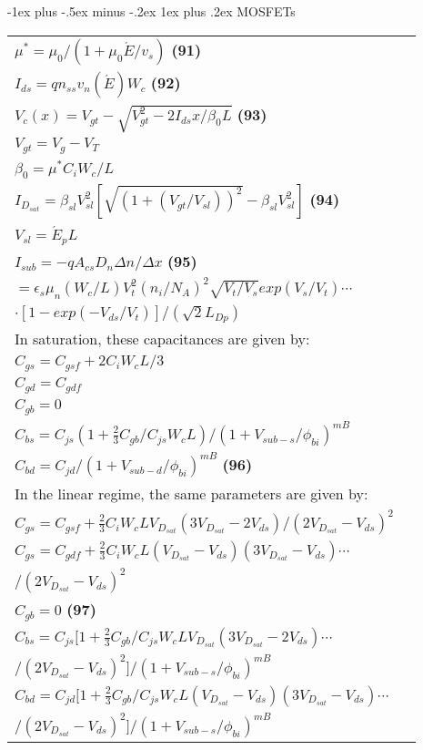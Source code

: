 \documentclass[10pt,landscape]{article}
\makeatletter
\renewcommand{\subsubsection}{\@startsection{subsubsection}{3}{0mm}%
                                {-1ex plus -.5ex minus -.2ex}%
                                {1ex plus .2ex}%
                                {\normalfont\small\bfseries}}
\makeatother
\begin{document}
\begin{multicols}{3}
\subsubsection{MOSFETs}
\begin{tabular}{@{}ll@{}}
$ \mu^*=\mu_0/(1+\mu_0 \acute{E}/v_s)$ \textbf{(91)} \\
$ I_{ds}=qn_{ss}v_n(\acute{E})W_c$ \textbf{(92)} \\
$ V_c(x)=V_{gt}-\sqrt{V^2_{gt}-2I_{ds}x/\beta_0L}$ \textbf{(93)} \\
$ V_{gt}=V_g-V_T$ \\
$ \beta_0=\mu^*C_iW_c/L$ \\
$ I_{D_{sat}}=\beta_{sl}V^2_{sl}[\sqrt{(1+(V_{gt}/V_{sl}))^2}-\beta_{sl}V^2_{sl}]$ \textbf{(94)} \\
$ V_{sl}=\acute{E}_pL$ \\
$ I_{sub}=-qA_{cs}D_n\Delta n/\Delta x$ \textbf{(95)} \\
$ =\epsilon_s\mu_n(W_c/L)V^2_t(n_i/N_A)^2\sqrt{V_t/V_s}exp(V_s/V_t)\cdots$ \\
$\cdot[1-exp(-V_{ds}/V_t)]/(\sqrt{2}L_{Dp})$ \\
In saturation, these capacitances are given by:\\
$ C_{gs}=C_{gsf}+2C_iW_cL/3$ \\
$ C_{gd}=C_{gdf}$ \\
$ C_{gb}=0$ \\
$ C_{bs}=C_{js}(1+\frac{2}{3}C_{gb}/C_{js}W_cL)/(1+V_{sub-s}/\phi_{bi})^{mB}$ \\
$ C_{bd}=C_{jd}/(1+V_{sub-d}/\phi_{bi})^{mB}$ \textbf{(96)} \\
In the linear regime, the same parameters are given by:\\
$ C_{gs}=C_{gsf}+\frac{2}{3}C_iW_cLV_{D_{sat}}(3V_{D_{sat}}-2V_{ds})/(2V_{D_{sat}}-V_{ds})^2$ \\
$ C_{gs}=C_{gdf}+\frac{2}{3}C_iW_cL(V_{D_{sat}}-V_{ds})(3V_{D_{sat}}-V_{ds})\cdots$ \\
$/(2V_{D_{sat}}-V_{ds})^2$ \\
$ C_{gb}=0$ \textbf{(97)} \\
$ C_{bs}=C_{js}[1+\frac{2}{3}C_{gb}/C_{js}W_cLV_{D_{sat}}(3V_{D_{sat}}-2V_{ds})\cdots$ \\
$/(2V_{D_{sat}}-V_{ds})^2]/(1+V_{sub-s}/\phi_{bi})^{mB}$ \\
$ C_{bd}=C_{jd}[1+\frac{2}{3}C_{gb}/C_{js}W_cL(V_{D_{sat}}-V_{ds})(3V_{D_{sat}}-V_{ds})\cdots$ \\
$/(2V_{D_{sat}}-V_{ds})^2]/(1+V_{sub-s}/\phi_{bi})^{mB}$ \\

\end{tabular}
\end{multicols}
\end{document}
